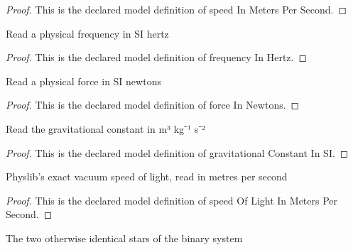 \begin{proof}
  This is the declared model definition of speed In Meters Per Second.
\end{proof}
\begin{definition}
  \label{def:physics:phyx-mini-0514:phyxminiproblems-problemphyxmini0514-frequencyinhertz}
  Read a physical frequency in SI hertz
\end{definition}
\begin{proof}
  This is the declared model definition of frequency In Hertz.
\end{proof}
\begin{definition}
  \label{def:physics:phyx-mini-0514:phyxminiproblems-problemphyxmini0514-forceinnewtons}
  Read a physical force in SI newtons
\end{definition}
\begin{proof}
  This is the declared model definition of force In Newtons.
\end{proof}
\begin{definition}
  \label{def:physics:phyx-mini-0514:phyxminiproblems-problemphyxmini0514-gravitationalconstantinsi}
  Read the gravitational constant in m³ kg⁻¹ s⁻²
\end{definition}
\begin{proof}
  This is the declared model definition of gravitational Constant In SI.
\end{proof}
\begin{definition}
  \label{def:physics:phyx-mini-0514:phyxminiproblems-problemphyxmini0514-speedoflightinmeterspersecond}
  Physlib's exact vacuum speed of light, read in metres per second
\end{definition}
\begin{proof}
  This is the declared model definition of speed Of Light In Meters Per Second.
\end{proof}
\begin{definition}
  \label{def:physics:phyx-mini-0514:phyxminiproblems-problemphyxmini0514-binarystar}
  The two otherwise identical stars of the binary system
\end{definition}
